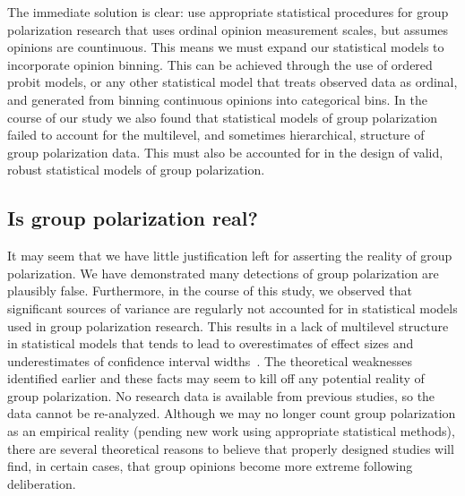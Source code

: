 The immediate solution is clear: use appropriate statistical procedures 
for group polarization research that uses ordinal opinion measurement
scales, but assumes opinions are countinuous. 
This means we must expand our statistical models to incorporate opinion binning.
This can be achieved through the use of ordered probit models, or any other
statistical model that treats observed data as ordinal, and generated from 
binning continuous opinions into categorical bins. In the course of our study
we also found that statistical models of group polarization failed to account
for the multilevel, and sometimes hierarchical, structure of group polarization
data. This must also be accounted for in the design of valid, robust 
statistical models of group polarization. 


\subsection{Is group polarization real?}

It may seem that we have little justification left for asserting the reality of
group polarization. We have demonstrated many detections of group polarization
are plausibly false. Furthermore, in the course of this study, 
we observed that significant sources of variance are regularly not 
accounted for in statistical models used in group polarization research. 
This results in a lack of multilevel structure in statistical models that
tends to lead to overestimates of effect sizes and underestimates of 
confidence interval widths~\cite{Clark1973,Yarkoni2021}.
The theoretical weaknesses identified earlier and these facts may seem to 
kill off any potential reality of group polarization. No research data is available
from previous studies, so the data cannot be re-analyzed.
Although we may no longer count group polarization as an empirical reality
(pending new work using appropriate statistical methods), 
there are several theoretical reasons to believe that properly designed studies
will find, in certain cases, that group
opinions become more extreme following deliberation. 


